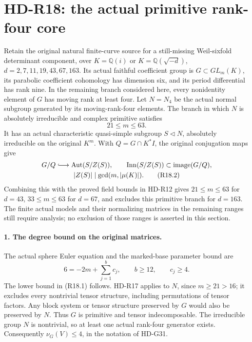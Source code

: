 \section{HD-R18: the actual primitive rank-four core}
\label{sec:rank-four-primitive-core}

Retain the original natural finite-curve source for a still-missing
Weil-sixfold determinant component, over
\(K=\mathbb Q(i)\) or \(K=\mathbb Q(\sqrt{-d})\),
\(d=2,7,11,19,43,67,163\). Its actual faithful coefficient
group is \(G\subset GL_m(K)\), its parabolic coefficient
cohomology has dimension six, and its period differential has
rank nine. In the remaining branch considered here, every
nonidentity element of \(G\) has moving rank at least four.
Let \(N=N_4\) be the actual normal subgroup generated by its
moving-rank-four elements. The branch in which \(N\) is
absolutely irreducible and complex primitive satisfies
\[
                         21\le m\le63.                 \tag{R18.1}
\]
It has an actual characteristic quasi-simple subgroup
\(S\triangleleft N\), absolutely irreducible on the original
\(K^m\). With \(Q=G\cap K^*I\), the original conjugation maps give
\[
 \begin{gathered}
 G/Q\lhook\joinrel\longrightarrow\operatorname{Aut}(S/Z(S)),
 \qquad\operatorname{Inn}(S/Z(S))\subset\operatorname{image}(G/Q),\\
                  |Z(S)|\mid\gcd(m,|\mu(K)|).           \tag{R18.2}
 \end{gathered}
\]
Combining this with the proved field bounds in HD-R12 gives
\(21\le m\le63\) for \(d=43\), \(33\le m\le63\) for
\(d=67\), and excludes this primitive branch for \(d=163\).
The finite actual models and their normalizing matrices in the
remaining ranges still require analysis; no exclusion of those
ranges is asserted in this section.

\paragraph{1. The degree bound on the original matrices.}
The actual sphere Euler equation and the marked-base parameter
bound are
\[
                  6=-2m+\sum_{j=1}^b c_j,
            \qquad b\ge12,\qquad c_j\ge4.               \tag{R18.3}
\]
The lower bound in (R18.1) follows. HD-R17 applies to \(N\),
since \(m\ge21>16\); it excludes every nontrivial tensor
structure, including permutations of tensor factors.
Any block system or tensor structure preserved by \(G\)
would also be preserved by \(N\). Thus \(G\) is primitive
and tensor indecomposable. The irreducible group \(N\) is
nontrivial, so at least one actual rank-four generator exists.
Consequently \(\nu_G(V)\le4\), in the notation of HD-G31.


